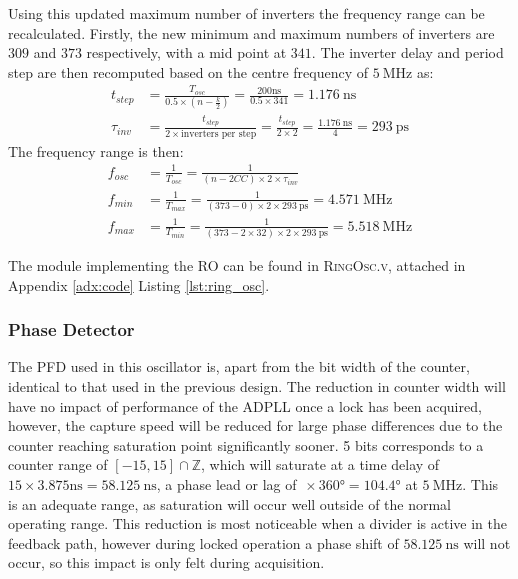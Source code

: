 Using this updated maximum number of inverters the frequency range can be recalculated. Firstly, the new minimum and maximum numbers of inverters are $309$ and $373$ respectively, with a mid point at $341$. The inverter delay and period step are then recomputed based on the centre frequency of $5~\si{\mega\hertz}$ as:
\begin{align}%
t_{step} &= \frac{T_{osc}}{0.5\times(n-\frac{k}{2})} = \frac{200\si{\nano\second}}{0.5\times 341} = 1.176~\si{\nano\second} \\
\tau_{inv} &= \frac{t_{step}}{2\times\text{inverters per step}} = \frac{t_{step}}{2\times2} = \frac{1.176~\si{\nano\second}}{4} = 293~\si{\pico\second}
\end{align}
The frequency range is then:
\begin{align} 
f_{osc} &= \frac{1}{T_{osc}} = \frac{1}{(n-2CC)\times 2\times\tau_{inv}} \\
f_{min} &= \frac{1}{T_{max}} = \frac{1}{(373-0)\times 2\times 293~\si{\pico\second}} = 4.571~\si{\mega\hertz} \\
f_{max} &= \frac{1}{T_{min}} = \frac{1}{(373-2\times32)\times 2\times 293~\si{\pico\second}} = 5.518~\si{\mega\hertz}
\end{align}

The module implementing the \ac{RO} can be found in \textsc{RingOsc.v}, attached in Appendix \ref{adx:code} Listing \ref{lst:ring_osc}.

\subsubsection{Phase Detector}
The \ac{PFD} used in this oscillator is, apart from the bit width of the counter, identical to that used in the previous design. The reduction in counter width will have no impact of performance of the \ac{ADPLL} once a lock has been acquired, however, the capture speed will be reduced for large phase differences due to the counter reaching saturation point significantly sooner. 5 bits corresponds to a counter range of $[-15,15]\cap\mathbb{Z}$, which will saturate at a time delay of $15\times3.875\si{\nano\second} = 58.125~\si{\nano\second}$, a phase lead or lag of $\frac{}{}\times360\si{\degree} = 104.4\si{\degree}$ at $5~\si{\mega\hertz}$. This is an adequate range, as saturation will occur well outside of the normal operating range. This reduction is most noticeable when a divider is active in the feedback path, however during locked operation a phase shift of $58.125~\si{\nano\second}$ will not occur, so this impact is only felt during acquisition.

